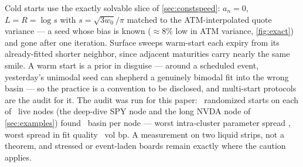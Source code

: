 Cold starts use the exactly solvable slice of \cref{sec:constspeed}:
$a_n=0$, $L=R=\log s$ with $s=\sqrt{3w_0}/\pi$ matched to the
ATM-interpolated quote variance --- a seed whose bias is known
($\approx8\%$ low in ATM variance, \cref{fig:exact}) and gone after one
iteration.  Surface sweeps warm-start each expiry from its
already-fitted shorter neighbor, since adjacent maturities carry nearly
the same smile.  A warm start is a prior in disguise --- around a
scheduled event, yesterday's unimodal seed can shepherd a genuinely
bimodal fit into the wrong basin --- so the practice is a convention to
be disclosed, and multi-start protocols are the audit for it.  The audit
was run for this paper: \MacMultiStartCount\ randomized starts on each
of \MacMultiStartNodes\ live nodes (the deep-dive SPY node and the long
NVDA node of \cref{sec:examples}) found \MacMultiStartBasins\ basin per
node --- worst intra-cluster parameter spread
\MacMultiStartWorstDTheta, worst spread in fit quality
\MacMultiStartWorstDIvBp\ vol bp.  A measurement on two liquid strips,
not a theorem, and stressed or event-laden boards remain exactly where
the caution applies.
